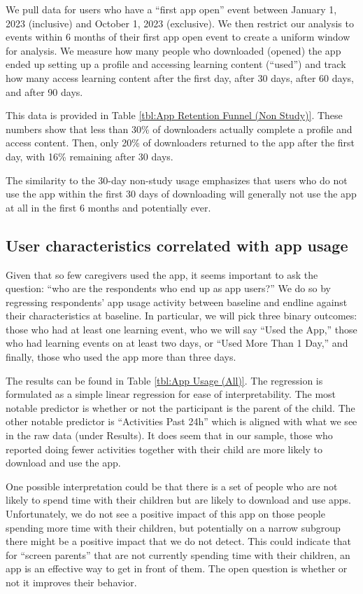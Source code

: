\documentclass{article}
\begin{document}
We pull data for users who have a “first app open” event between January 1, 2023 (inclusive) and October 1, 2023 (exclusive). We then restrict our analysis to events within 6 months of their first app open event to create a uniform window for analysis. We measure how many people who downloaded (opened) the app ended up setting up a profile and accessing learning content (“used”) and track how many access learning content after the first day, after 30 days, after 60 days, and after 90 days.

This data is provided in Table {\ref{tbl:App Retention Funnel (Non Study)}}. These numbers show that less than 30\% of downloaders actually complete a profile and access content. Then, only 20\% of downloaders returned to the app after the first day, with 16\% remaining after 30 days.

The similarity to the 30-day non-study usage emphasizes that users who do not use the app within the first 30 days of downloading will generally not use the app at all in the first 6 months and potentially ever.




\subsection{User characteristics correlated with app usage}

Given that so few caregivers used the app, it seems important to ask the question: “who are the respondents who end up as app users?” We do so by regressing respondents’ app usage activity between baseline and endline against their characteristics at baseline. In particular, we will pick three binary outcomes: those who had at least one learning event, who we will say “Used the App,” those who had learning events on at least two days, or “Used More Than 1 Day,” and finally, those who used the app more than three days.

The results can be found in Table \ref{tbl:App Usage (All)}. The regression is formulated as a simple linear regression for ease of interpretability. The most notable predictor is whether or not the participant is the parent of the child. The other notable predictor is “Activities Past 24h” which is aligned with what we see in the raw data (under Results). It does seem that in our sample, those who reported doing fewer activities together with their child are more likely to download and use the app.

One possible interpretation could be that there is a set of people who are not likely to spend time with their children but are likely to download and use apps. Unfortunately, we do not see a positive impact of this app on those people spending more time with their children, but potentially on a narrow subgroup there might be a positive impact that we do not detect. This could indicate that for “screen parents” that are not currently spending time with their children, an app is an effective way to get in front of them. The open question is whether or not it improves their behavior.
\end{document}
